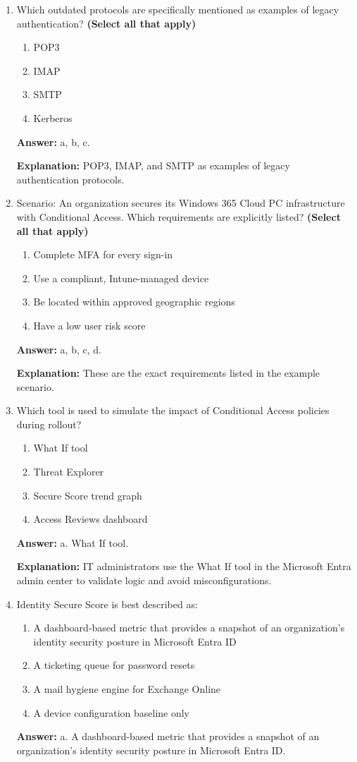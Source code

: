 \documentclass[10pt]{article}
\begin{document}
\begin{enumerate}[leftmargin=*]
\item Which outdated protocols are specifically mentioned as examples of legacy authentication? \textbf{(Select all that apply)}
\begin{enumerate}[label=\alph*., leftmargin=1.5em]
\item POP3
\item IMAP
\item SMTP
\item Kerberos
\end{enumerate}
\textbf{Answer:} a, b, c.

\textbf{Explanation:} POP3, IMAP, and SMTP as examples of legacy authentication protocols.

\item Scenario: An organization secures its Windows 365 Cloud PC infrastructure with Conditional Access. Which requirements are explicitly listed? \textbf{(Select all that apply)}
\begin{enumerate}[label=\alph*., leftmargin=1.5em]
\item Complete MFA for every sign-in
\item Use a compliant, Intune-managed device
\item Be located within approved geographic regions
\item Have a low user risk score
\end{enumerate}
\textbf{Answer:} a, b, c, d.

\textbf{Explanation:} These are the exact requirements listed in the example scenario.

\item Which tool is used to simulate the impact of Conditional Access policies during rollout?
\begin{enumerate}[label=\alph*., leftmargin=1.5em]
\item What If tool
\item Threat Explorer
\item Secure Score trend graph
\item Access Reviews dashboard
\end{enumerate}
\textbf{Answer:} a. What If tool.

\textbf{Explanation:} IT administrators use the What If tool in the Microsoft Entra admin center to validate logic and avoid misconfigurations.

\item Identity Secure Score is best described as:
\begin{enumerate}[label=\alph*., leftmargin=1.5em]
\item A dashboard-based metric that provides a snapshot of an organization’s identity security posture in Microsoft Entra ID
\item A ticketing queue for password resets
\item A mail hygiene engine for Exchange Online
\item A device configuration baseline only
\end{enumerate}
\textbf{Answer:} a. A dashboard-based metric that provides a snapshot of an organization’s identity security posture in Microsoft Entra ID.


\end{enumerate}
\end{document}
